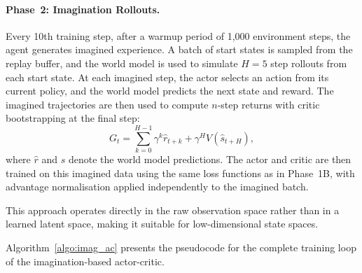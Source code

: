 \paragraph{Phase~2: Imagination Rollouts.}
Every 10th training step, after a warmup period of 1{,}000 environment steps, the
agent generates imagined experience. A batch of start states is sampled from the
replay buffer, and the world model is used to simulate $H = 5$ step rollouts from
each start state. At each imagined step, the actor selects an action from its
current policy, and the world model predicts the next state and reward. The
imagined trajectories are then used to compute $n$-step returns with critic
bootstrapping at the final step:
\begin{equation}
    \label{eq:nstep_return}
    G_t = \sum_{k=0}^{H-1} \gamma^k \hat{r}_{t+k} + \gamma^H V(\hat{s}_{t+H}),
\end{equation}
where $\hat{r}$ and $\hat{s}$ denote the world model predictions. The actor and
critic are then trained on this imagined data using the same loss functions as in
Phase~1B, with advantage normalisation applied independently to the imagined batch.

This approach operates directly in the raw observation
space rather than in a learned latent space, making it suitable for low-dimensional state spaces.

Algorithm~\ref{algo:imag_ac} presents the pseudocode for the complete training
loop of the imagination-based actor-critic.

